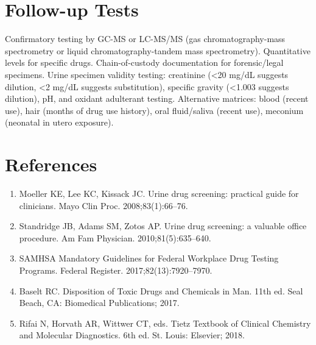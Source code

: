 \section*{Follow-up Tests}
Confirmatory testing by GC-MS or LC-MS/MS (gas chromatography-mass spectrometry or liquid chromatography-tandem mass spectrometry). Quantitative levels for specific drugs. Chain-of-custody documentation for forensic/legal specimens. Urine specimen validity testing: creatinine (<20 mg/dL suggests dilution, <2 mg/dL suggests substitution), specific gravity (<1.003 suggests dilution), pH, and oxidant adulterant testing. Alternative matrices: blood (recent use), hair (months of drug use history), oral fluid/saliva (recent use), meconium (neonatal in utero exposure).
\section*{References}
\begin{enumerate}
  \item Moeller KE, Lee KC, Kissack JC. Urine drug screening: practical guide for clinicians. Mayo Clin Proc. 2008;83(1):66--76.
  \item Standridge JB, Adams SM, Zotos AP. Urine drug screening: a valuable office procedure. Am Fam Physician. 2010;81(5):635--640.
  \item SAMHSA Mandatory Guidelines for Federal Workplace Drug Testing Programs. Federal Register. 2017;82(13):7920--7970.
  \item Baselt RC. Disposition of Toxic Drugs and Chemicals in Man. 11th ed. Seal Beach, CA: Biomedical Publications; 2017.
  \item Rifai N, Horvath AR, Wittwer CT, eds. Tietz Textbook of Clinical Chemistry and Molecular Diagnostics. 6th ed. St. Louis: Elsevier; 2018.
\end{enumerate}
\clearpage

